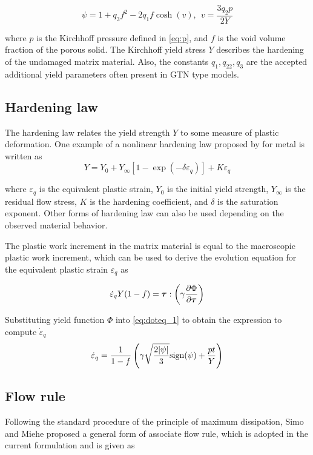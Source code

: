 \begin{equation}
\psi = 1 + q_3 f^2 - 2 q_1 f \cosh(v), ~~v=\frac{3 q_2 p}{2 Y}
\end{equation}

where $p$ is the Kirchhoff pressure defined in \eqref{eq:p}, and $f$
is the void volume fraction of the porous solid. The Kirchhoff yield
stress $Y$ describes the hardening of the undamaged matrix
material. Also, the constants $q_1,q_22,q_3$ are the accepted
additional yield parameters often present in GTN type models.

\subsection{Hardening law}
The hardening law relates the yield strength $Y$ to some measure of
plastic deformation. One example of a nonlinear hardening law proposed
by \cite{SimoHughes:98} for metal is written as
\begin{equation}
Y = Y_0 + Y_{\infty}\left[ 1-\exp(-\delta\varepsilon_q)\right] +
K\varepsilon_q
\end{equation}

where $\varepsilon_q$ is the equivalent plastic strain, $Y_0$ is the
initial yield strength, $Y_{\infty}$ is the residual flow stress, $K$
is the hardening coefficient, and $\delta$ is the saturation
exponent. Other forms of hardening law can also be used depending on
the observed material behavior.

The plastic work increment in the matrix material is equal to the
macroscopic plastic work increment, which can be used to derive the
evolution equation for the equivalent plastic strain $\varepsilon_q$
as

\begin{equation}\label{eq:doteq_1}
\dot{\varepsilon}_q Y(1-f) = {\boldsymbol{\tau}} : \left(
\gamma\frac{\partial\Phi}{\partial{\boldsymbol{\tau}}} \right)
\end{equation}

Substituting yield function $\Phi$ into \eqref{eq:doteq_1} to obtain
the expression to compute $\dot{\varepsilon}_q$
\begin{equation}\label{eq:doteq}
  \dot{\varepsilon}_q =\frac{1}{1-f}\left(
  \gamma\sqrt{\frac{2|\psi|}{3}} {\rm sign}(\psi) + \frac{p t}{Y}
  \right)
\end{equation}


\subsection{Flow rule}
Following the standard procedure of the principle of maximum
dissipation, Simo and Miehe \cite{Simo1992} proposed a general form 
of associate flow rule, which is adopted in the current formulation 
and is given as


